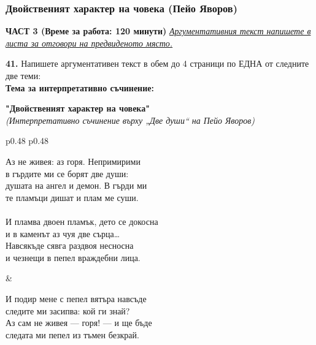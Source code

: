 \documentclass[12pt,a4paper]{article}
\begin{document}
\subsubsection{Двойственият характер на човека (Пейо Яворов)}
\vspace{0.5cm}
\begin{center}
\textbf{ЧАСТ 3 (Време за работа: 120 минути)}
\vspace{0.2cm}
{\textit{\underline{Аргументативния текст напишете в листа за отговори на предвиденото място.}}}
\vspace{0.1cm}
\end{center}
\textbf{41.} Напишете аргументативен текст в обем до 4 страници по ЕДНА от следните две теми:
\\
\vspace{0.2cm}
\textbf{Тема за интерпретативно съчинение:}
\vspace{0.1cm}
\begin{center}
\textbf{"Двойственият характер на човека"}
\\
\textit{(Интерпретативно съчинение върху „Две души“ на Пейо Яворов)}
\end{center}
\begin{tabular}{p{0.48\textwidth} p{0.48\textwidth}}
\begin{minipage}[t]{\linewidth}
Аз не живея: аз горя. Непримирими\\
в гърдите ми се борят две души:\\
душата на ангел и демон. В гърди ми\\
те пламъци дишат и плам ме суши.\\
\\
И пламва двоен пламък, дето се докосна\\
и в каменът аз чуя две сърца…\\
Навсякъде сявга раздвоя несносна\\
и чезнещи в пепел враждебни лица.\\
\end{minipage}
&
\begin{minipage}[t]{\linewidth}
И подир мене с пепел вятъра навсъде\\
следите ми засипва: кой ги знай?\\
Аз сам не живея — горя! — и ще бъде\\
следата ми пепел из тъмен безкрай.\\
\end{minipage}
\end{tabular}
\newpage
\end{document}
